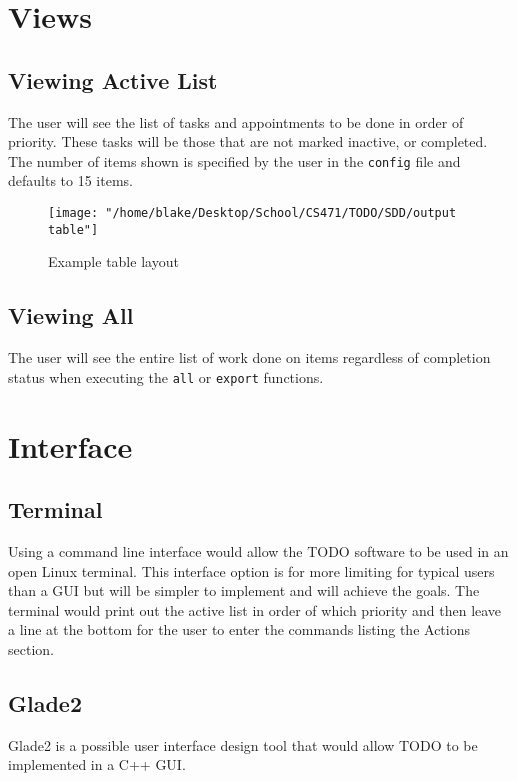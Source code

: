 \documentclass[12pt]{article}
\newcommand{\e}[1] {{\tt #1}}
\begin{document}
\section{Views}
\subsection{Viewing Active List}
The user will see the list of tasks and appointments to be done in order of priority. These tasks will be those that are not marked inactive, or completed. The number of items shown is specified by the user in the \e{config} file and defaults to 15 items. 
\\
\begin{center}
\begin{figure}[H]
\texttt{[image: "/home/blake/Desktop/School/CS471/TODO/SDD/output table"]}
\caption{Example table layout}
\label{fig:table}
\end{figure}
\end{center}

\subsection{Viewing All} \label{sec:View all}
The user will see the entire list of work done on items regardless of completion status when executing the \e{all} or \e{export} functions.

\section{Interface}
\subsection{Terminal}
Using a command line interface would allow the TODO software to be used in an open Linux terminal. This interface option is for more limiting for typical users than a GUI but will be simpler to implement and will achieve the goals. The terminal would print out the active list in order of which priority and then leave a line at the bottom for the user to enter the commands listing the Actions section.

\subsection{Glade2}
Glade2 is a possible user interface design tool that would allow TODO to be implemented in a C++ GUI.  
\end{document}
